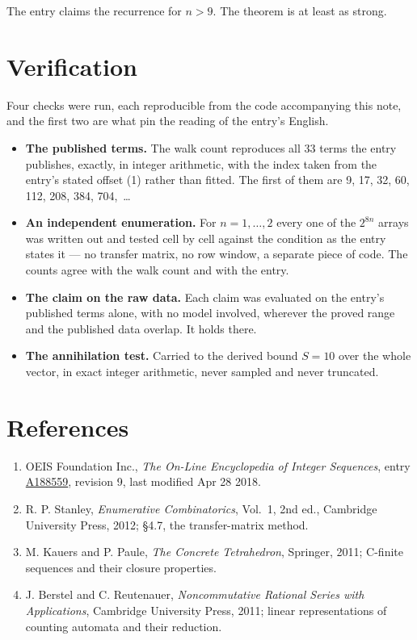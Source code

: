 \documentclass[11pt]{article}
\theoremstyle{definition}
\begin{document}
The entry claims the recurrence for $n > 9$. The theorem is at least as strong.

\section{Verification}

Four checks were run, each reproducible from the code accompanying this note, and the first two are what pin the reading of the entry's English.

\begin{itemize}

\item {\bfseries The published terms.} The walk count reproduces all 33 terms the entry publishes, exactly, in integer arithmetic, with the index taken from the entry's stated offset (1) rather than fitted. The first of them are 9, 17, 32, 60, 112, 208, 384, 704,~\dots

\item {\bfseries An independent enumeration.} For $n = 1,\dots,2$ every one of the $2^{8n}$ arrays was written out and tested cell by cell against the condition as the entry states it --- no transfer matrix, no row window, a separate piece of code. The counts agree with the walk count and with the entry.

\item {\bfseries The claim on the raw data.} Each claim was evaluated on the entry's published terms alone, with no model involved, wherever the proved range and the published data overlap. It holds there.

\item {\bfseries The annihilation test.} Carried to the derived bound $S = 10$ over the whole vector, in exact integer arithmetic, never sampled and never truncated.

\end{itemize}

\section{References}

\begin{enumerate}

\item OEIS Foundation Inc., \emph{The On-Line Encyclopedia of Integer Sequences}, entry \href{https://oeis.org/A188559}{A188559}, revision 9, last modified Apr 28 2018.

\item R. P. Stanley, \emph{Enumerative Combinatorics}, Vol.~1, 2nd ed., Cambridge University Press, 2012; \S4.7, the transfer-matrix method.

\item M. Kauers and P. Paule, \emph{The Concrete Tetrahedron}, Springer, 2011; C-finite sequences and their closure properties.

\item J. Berstel and C. Reutenauer, \emph{Noncommutative Rational Series with Applications}, Cambridge University Press, 2011; linear representations of counting automata and their reduction.

\end{enumerate}
\end{document}
